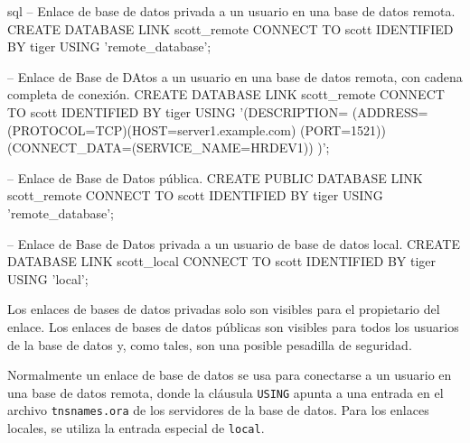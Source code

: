 \documentclass[../main.tex]{subfiles}
\begin{document}
\begin{enumerate}
\begin{code}{sql}
-- Enlace de base de datos privada a un usuario en una base de datos remota.
CREATE DATABASE LINK scott_remote
   CONNECT TO scott IDENTIFIED BY tiger
   USING 'remote_database';

-- Enlace de Base de DAtos a un usuario en una base de datos remota, con cadena completa de conexión.
CREATE DATABASE LINK scott_remote
   CONNECT TO scott IDENTIFIED BY tiger
   USING '(DESCRIPTION=
   (ADDRESS=(PROTOCOL=TCP)(HOST=server1.example.com)
   (PORT=1521))
   (CONNECT_DATA=(SERVICE_NAME=HRDEV1))
   )';

-- Enlace de Base de Datos pública.
CREATE PUBLIC DATABASE LINK scott_remote
   CONNECT TO scott IDENTIFIED BY tiger
   USING 'remote_database';

-- Enlace de Base de Datos privada a un usuario de base de datos local.
CREATE DATABASE LINK scott_local
   CONNECT TO scott IDENTIFIED BY tiger
   USING 'local';
        \end{code}

        Los enlaces de bases de datos privadas solo son visibles para el propietario
        del enlace. Los enlaces de bases de datos públicas son visibles para todos los
        usuarios de la base de datos y, como tales, son una posible pesadilla de
        seguridad.

        Normalmente un enlace de base de datos se usa para conectarse
        a un usuario en una base de datos remota, donde la cláusula \texttt{USING} apunta a una
        entrada en el archivo \texttt{tnsnames.ora} de los servidores de la base de datos. Para
        los enlaces locales, se utiliza la entrada especial de \texttt{local}.

\end{enumerate}
\end{document}
